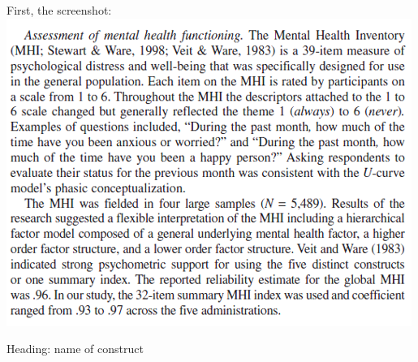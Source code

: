 \documentclass[
  english,
]{book}
\begin{document}
First, the screenshot:
\includegraphics{images/PsychoM/MHI.png}

Heading: name of construct
\end{document}
